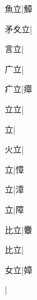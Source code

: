 \begin{multicols}{2}
{{\cjk{}{\cnsym{}　}魚立}\mktsJzrVerticalBar{}{\cjk{}{\cnsym{}　}{\cnsym{}　}{\cnsym{}　}}|{\cjk{}鱆}\par
{\cjk{}矛夊立}\mktsJzrVerticalBar{}{\cjk{}{\cnsym{}　}{\cnsym{}　}{\cnsym{}　}}|{}\par
{\cjk{}{\cnsym{}　}言立}\mktsJzrVerticalBar{}{\cjk{}{\cnsym{}　}{\cnsym{}　}{\cnsym{}　}}|{}\par
{\cjk{}{\cnsym{}　}广立}\mktsJzrVerticalBar{}{\cjk{}{\cnsym{}　}{\cnsym{}　}{\cnsym{}　}}|{}\par
{\cjk{}{\cnsym{}　}疒立}\mktsJzrVerticalBar{}{\cjk{}{\cnsym{}　}{\cnsym{}　}{\cnsym{}　}}|{\cjk{}瘴}\par
{\cjk{}{\cnsym{}　}立立}\mktsJzrVerticalBar{}{\cjk{}{\cnsym{}　}{\cnsym{}　}{\cnsym{}　}}|{}\par
{立}\mktsJzrVerticalBar{}{\cjk{}{\cnsym{}　}{\cnsym{}　}{\cnsym{}　}}|{}\par
{\cjk{}{\cnsym{}　}火立}\mktsJzrVerticalBar{}{\cjk{}{\cnsym{}　}{\cnsym{}　}{\cnsym{}　}}|{}\par
{立}\mktsJzrVerticalBar{}{\cjk{}{\cnsym{}　}{\cnsym{}　}{\cnsym{}　}}|{\cjk{}慞}\par
{立}\mktsJzrVerticalBar{}{\cjk{}{\cnsym{}　}{\cnsym{}　}{\cnsym{}　}}|{\cjk{}漳}\par
{立}\mktsJzrVerticalBar{}{\cjk{}{\cnsym{}　}{\cnsym{}　}{\cnsym{}　}}|{\cjk{}障}\par
{比立}\mktsJzrVerticalBar{}{\cjk{}{\cnsym{}　}{\cnsym{}　}{\cnsym{}　}}|{\cjk{}麞}\par
{比立}\mktsJzrVerticalBar{}{\cjk{}{\cnsym{}　}{\cnsym{}　}{\cnsym{}　}}|{}\par
{\cjk{}{\cnsym{}　}女立}\mktsJzrVerticalBar{}{\cjk{}{\cnsym{}　}{\cnsym{}　}{\cnsym{}　}}|{\cjk{}嫜}\par
{}\mktsJzrVerticalBar{}{\cjk{}{\cnsym{}　}{\cnsym{}　}{\cnsym{}　}}|{}\par
}
\end{multicols}
